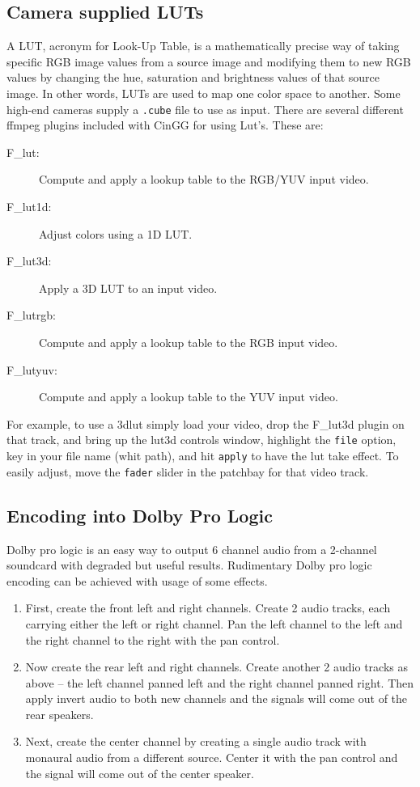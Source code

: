 \subsection{Camera supplied LUTs}%
\label{sub:camera_supplied_luts}

A LUT, acronym for Look-Up Table, is a mathematically precise way of taking specific RGB image values from a source image and modifying them to new RGB values by changing the hue, saturation and brightness values of that source image. In other words, LUTs are used to map one color space to another.  Some high-end cameras supply a \texttt{.cube} file to use as input. There are several different ffmpeg plugins included with CinGG for using Lut's.  These are:

\begin{description}
	\item[F\_lut:] Compute and apply a lookup table to the RGB/YUV input video.
	\item[F\_lut1d:] Adjust colors using a 1D LUT.
	\item[F\_lut3d:] Apply a 3D LUT to an input video.
	\item[F\_lutrgb:] Compute and apply a lookup table to the RGB input video.
	\item[F\_lutyuv:] Compute and apply a lookup table to the YUV input video.
\end{description}

For example, to use a 3dlut simply load your video, drop the F\_lut3d plugin on that track, and bring up the lut3d controls window, highlight the \texttt{file} option, key in your file name (whit path), and hit \texttt{apply} to have the lut take effect.  To easily adjust, move the \texttt{fader} slider in the patchbay for that video track.

\subsection{Encoding into Dolby Pro Logic}%
\label{sub:encoding_dolby_pro_logic}

Dolby pro logic is an easy way to output 6 channel audio from a 2-channel soundcard with degraded but useful results. Rudimentary Dolby pro logic encoding can be achieved with usage of some effects.

\begin{enumerate}
	\item First, create the front left and right channels. Create 2 audio tracks, each carrying either the left or
	right channel. Pan the left channel to the left and the right channel to the right with the pan control.
	\item Now create the rear left and right channels. Create another 2 audio tracks as above -- the left channel
	panned left and the right channel panned right. Then apply invert audio to both new channels and
	the signals will come out of the rear speakers.
	\item Next, create the center channel by creating a single audio track with monaural audio from a
	different source. Center it with the pan control and the signal will come out of the center speaker.
\end{enumerate}

